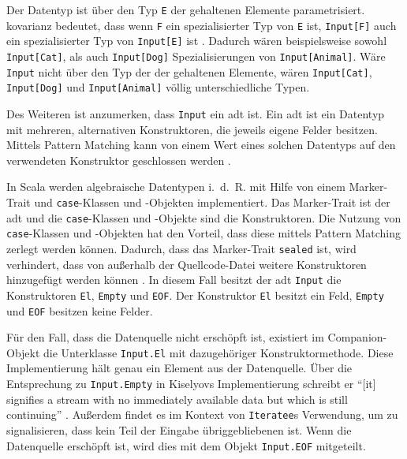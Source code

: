 Der Datentyp ist über den  Typ \lstinline|E| der gehaltenen Elemente parametrisiert.
\gls{kovarianz} bedeutet, dass wenn \lstinline|F| ein spezialisierter Typ von \lstinline|E| ist, \lstinline|Input[F]| auch ein spezialisierter Typ von \lstinline|Input[E]| ist \cite[vgl.][S.~430]{programming_in_scala}.
Dadurch wären beispielsweise sowohl \lstinline|Input[Cat]|, als auch \lstinline|Input[Dog]| Spezialisierungen von \lstinline|Input[Animal]|.
Wäre \lstinline|Input| nicht  über den Typ der der gehaltenen Elemente, wären \lstinline|Input[Cat]|, \lstinline|Input[Dog]| und \lstinline|Input[Animal]| völlig unterschiedliche Typen.

Des Weiteren ist anzumerken, dass \lstinline|Input| ein \gls{adt} ist.
Ein \gls{adt} ist ein Datentyp mit mehreren, alternativen Konstruktoren, die jeweils eigene Felder besitzen.
Mittels Pattern Matching kann von einem Wert eines solchen Datentyps auf den verwendeten Konstruktor geschlossen werden \cite[vgl.][S.~14--15]{algebraic_data_type}.

In Scala werden algebraische Datentypen i.~d.~R. mit Hilfe von einem Marker-Trait und \lstinline|case|-Klassen und -Objekten implementiert.
Das Marker-Trait ist der \gls{adt} und die \lstinline|case|-Klassen und -Objekte sind die Konstruktoren.
Die Nutzung von \lstinline|case|-Klassen und -Objekten hat den Vorteil, dass diese mittels Pattern Matching zerlegt werden können.
Dadurch, dass das Marker-Trait \lstinline|sealed| ist, wird verhindert, dass von außerhalb der Quellcode-Datei weitere Konstruktoren hinzugefügt werden können \cite[vgl.][]{algebraic_data_type_scala}.
In diesem Fall besitzt der \gls{adt} \lstinline|Input| die Konstruktoren \lstinline|El|, \lstinline|Empty| und \lstinline|EOF|.
Der Konstruktor \lstinline|El| besitzt ein Feld, \lstinline|Empty| und \lstinline|EOF| besitzen keine Felder.

Für den Fall, dass die Datenquelle nicht erschöpft ist, existiert im Companion-Objekt die Unterklasse \lstinline|Input.El| mit dazugehöriger Konstruktormethode.
Diese Implementierung hält genau ein Element aus der Datenquelle.
Über die Entsprechung zu \lstinline|Input.Empty| in Kiselyovs Implementierung schreibt er "`[it] signifies a stream with no immediately available data but which is still continuing"' \cite[vgl.][]{iteratee_io}.
Außerdem findet es im Kontext von \lstinline|Iteratee|s Verwendung, um zu signalisieren, dass kein Teil der Eingabe übriggebliebenen ist.
Wenn die Datenquelle erschöpft ist, wird dies mit dem Objekt \lstinline|Input.EOF| mitgeteilt.

